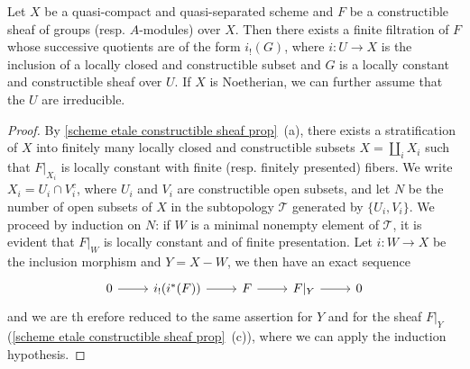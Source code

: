 \begin{proposition}\label{scheme qcqs etale constructible sheaf filtration}
Let $X$ be a quasi-compact and quasi-separated scheme and $F$ be a constructible sheaf of groups (resp. $A$-modules) over $X$. Then there exists a finite filtration of $F$ whose successive quotients are of the form $i_!(G)$, where $i:U\to X$ is the inclusion of a locally closed and constructible subset and $G$ is a locally constant and constructible sheaf over $U$. If $X$ is Noetherian, we can further assume that the $U$ are irreducible.
\end{proposition}
\begin{proof}
By \cref{scheme etale constructible sheaf prop}~(a), there exists a stratification of $X$ into finitely many locally closed and constructible subsets $X=\coprod_iX_i$ such that $F|_{X_i}$ is locally constant with finite (resp. finitely presented) fibers. We write $X_i=U_i\cap V_i^c$, where $U_i$ and $V_i$ are constructible open subsets, and let $N$ be the number of open subsets of $X$ in the subtopology $\mathcal{T}$ generated by $\{U_i,V_i\}$. We proceed by induction on $N$: if $W$ is a minimal nonempty element of $\mathcal{T}$, it is evident that $F|_W$ is locally constant and of finite presentation. Let $i:W\to X$ be the inclusion morphism and $Y=X-W$, we then have an exact sequence
\[\begin{tikzcd}
0\ar[r]&i_!(i^*(F))\ar[r]&F\ar[r]&F|_Y\ar[r]&0
\end{tikzcd}\]
and we are th erefore reduced to the same assertion for $Y$ and for the sheaf $F|_Y$ (\cref{scheme etale constructible sheaf prop}~(c)), where we can apply the induction hypothesis.
\end{proof}

